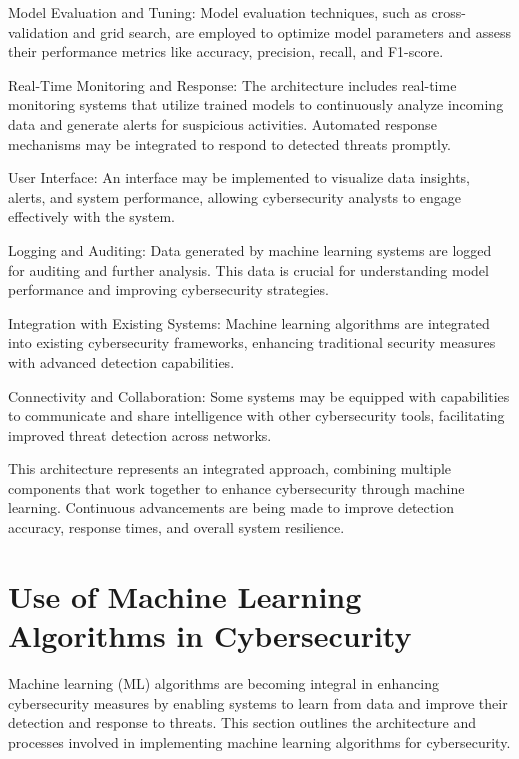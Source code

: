 \documentclass[oneside,a4paper,12pt]{report}
\begin{document}
Model Evaluation and Tuning:  
Model evaluation techniques, such as cross-validation and grid search, are employed to optimize model parameters and assess their performance metrics like accuracy, precision, recall, and F1-score.

\pageborder

Real-Time Monitoring and Response:  
The architecture includes real-time monitoring systems that utilize trained models to continuously analyze incoming data and generate alerts for suspicious activities. Automated response mechanisms may be integrated to respond to detected threats promptly.

User Interface:
An interface may be implemented to visualize data insights, alerts, and system performance, allowing cybersecurity analysts to engage effectively with the system.

\pageborder

Logging and Auditing:
Data generated by machine learning systems are logged for auditing and further analysis. This data is crucial for understanding model performance and improving cybersecurity strategies.

Integration with Existing Systems: 
Machine learning algorithms are integrated into existing cybersecurity frameworks, enhancing traditional security measures with advanced detection capabilities.

\pageborder

Connectivity and Collaboration: 
Some systems may be equipped with capabilities to communicate and share intelligence with other cybersecurity tools, facilitating improved threat detection across networks.

This architecture represents an integrated approach, combining multiple components that work together to enhance cybersecurity through machine learning. Continuous advancements are being made to improve detection accuracy, response times, and overall system resilience.

\pageborder
\section{Use of Machine Learning Algorithms in Cybersecurity}
Machine learning (ML) algorithms are becoming integral in enhancing cybersecurity measures by enabling systems to learn from data and improve their detection and response to threats. This section outlines the architecture and processes involved in implementing machine learning algorithms for cybersecurity.
\end{document}
